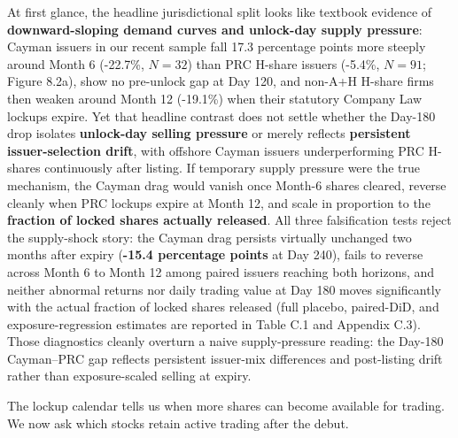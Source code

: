 \documentclass[11pt,letterpaper]{article}
\begin{document}
At first glance, the headline jurisdictional split looks like textbook evidence of \textbf{downward-sloping demand curves and unlock-day supply pressure}: Cayman issuers in our recent sample fall 17.3 percentage points more steeply around Month 6 (-22.7\%, $N=32$) than PRC H-share issuers (-5.4\%, $N=91$; Figure 8.2a), show no pre-unlock gap at Day 120, and non-A+H H-share firms then weaken around Month 12 (-19.1\%) when their statutory Company Law lockups expire. Yet that headline contrast does not settle whether the Day-180 drop isolates \textbf{unlock-day selling pressure} or merely reflects \textbf{persistent issuer-selection drift}, with offshore Cayman issuers underperforming PRC H-shares continuously after listing. If temporary supply pressure were the true mechanism, the Cayman drag would vanish once Month-6 shares cleared, reverse cleanly when PRC lockups expire at Month 12, and scale in proportion to the \textbf{fraction of locked shares actually released}. All three falsification tests reject the supply-shock story: the Cayman drag persists virtually unchanged two months after expiry (\textbf{-15.4 percentage points} at Day 240), fails to reverse across Month 6 to Month 12 among paired issuers reaching both horizons, and neither abnormal returns nor daily trading value at Day 180 moves significantly with the actual fraction of locked shares released (full placebo, paired-DiD, and exposure-regression estimates are reported in Table C.1 and Appendix C.3). Those diagnostics cleanly overturn a naive supply-pressure reading: the Day-180 Cayman–PRC gap reflects persistent issuer-mix differences and post-listing drift rather than exposure-scaled selling at expiry.

The lockup calendar tells us when more shares can become available for trading. We now ask which stocks retain active trading after the debut.
\end{document}
